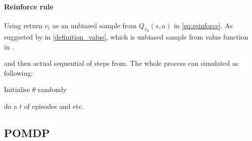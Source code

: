 
\paragraph{Reinforce rule}
Using return $v_t$ as an unbiased sample from $Q_{\pi_{\theta}}(s, a)$
in \ref{eq:reinforce}. As suggested by in \ref{definition_value},
which is unbiased sample from value function in .

and then actual sequential of steps from.
The whole process can simulated as following:

\begin{orderedlisting}
	\item Initialise $\theta$ randomly
	\item do a $t$ of episodes
	and etc.
\end{orderedlisting}

%



\subsection{POMDP} \label{subs:POMDP}




%

